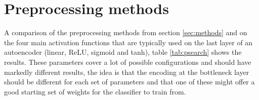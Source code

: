       \section{Preprocessing methods} \label{sec:psearch}

          A comparison of the preprocessing methods from section
          \ref{sec:methods} and on the four main activation functions
          that are typically used on the last layer of an autoencoder
          (linear, ReLU, sigmoid and tanh),
          table \ref{tab:psearch} shows the results.
          These parameters cover a lot of possible
          configurations and should have markedly different results, the idea
          is that the encoding at the bottleneck layer should be different for
          each set of parameters and that
          one of these might offer a good starting set of weights for the
          classifier to train from.

